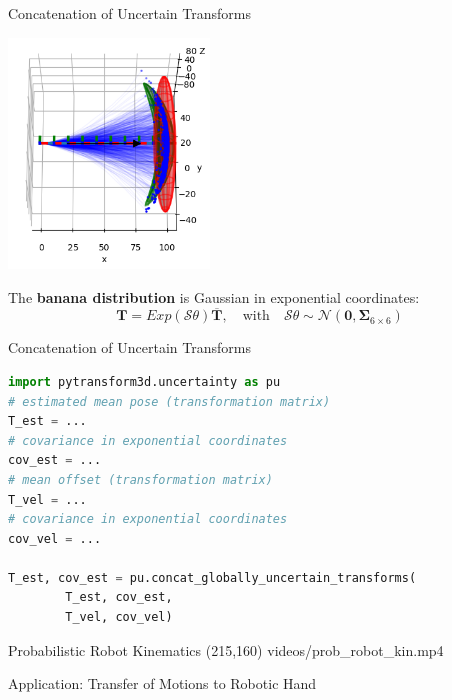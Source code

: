 \documentclass[14pt]{beamer}
\begin{document}
\begin{frame}[fragile]{Concatenation of Uncertain Transforms}
\begin{center}\includegraphics[width=0.4\textwidth]{images/state_estimation}\end{center}
\vskip -0.4cm
The \textbf{banana distribution} is Gaussian in exponential coordinates:
\[
\boldsymbol{T} = Exp(\mathcal{S}\theta) \overline{\boldsymbol{T}},\quad \textrm{with} \quad \mathcal{S}\theta \sim \mathcal{N}\left(\boldsymbol{0}, \boldsymbol{\Sigma}_{6 \times 6}\right)
\]
\parencite{Long2012,Barfoot2014}
\end{frame}

\begin{frame}[fragile]{Concatenation of Uncertain Transforms}
\begin{lstlisting}[language=Python]
import pytransform3d.uncertainty as pu
# estimated mean pose (transformation matrix)
T_est = ...
# covariance in exponential coordinates
cov_est = ...
# mean offset (transformation matrix)
T_vel = ...
# covariance in exponential coordinates
cov_vel = ...

T_est, cov_est = pu.concat_globally_uncertain_transforms(
        T_est, cov_est,
        T_vel, cov_vel)
\end{lstlisting}
\end{frame}

\begin{frame}[fragile]{Probabilistic Robot Kinematics}
\makebox(215,160){
{videos/prob_robot_kin.mp4}}%
\end{frame}

\begin{frame}
\begin{center}
\Large
Application: Transfer of Motions to Robotic Hand
\end{center}
\end{frame}
\end{document}
